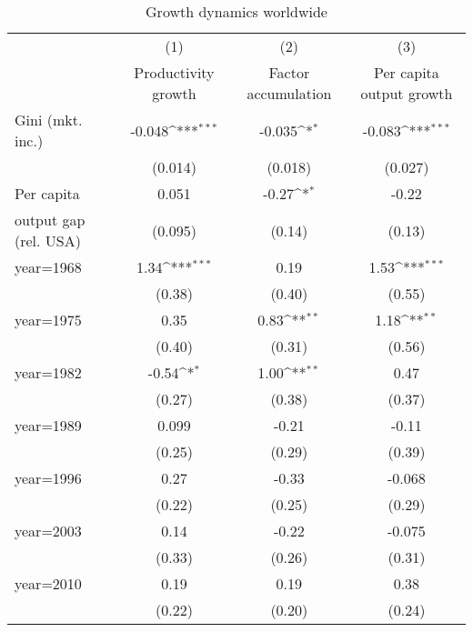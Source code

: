 \begin{sidewaystable}[htbp]\centering
\def\sym#1{\ifmmode^{#1}\else\(^{#1}\)\fi}
\caption{Growth dynamics worldwide}
\begin{tabular}{l*{3}{c}}
\hline\hline
                &\multicolumn{1}{c}{(1)}&\multicolumn{1}{c}{(2)}&\multicolumn{1}{c}{(3)}\\
                &\multicolumn{1}{c}{Productivity growth}&\multicolumn{1}{c}{Factor accumulation}&\multicolumn{1}{c}{Per capita output growth}\\
\hline
Gini (mkt. inc.)&   -0.048\sym{***}&   -0.035\sym{*}  &   -0.083\sym{***}\\
                &  (0.014)         &  (0.018)         &  (0.027)         \\
[1em]
Per capita      &    0.051         &    -0.27\sym{*}  &    -0.22         \\
output gap (rel. USA)&  (0.095)         &   (0.14)         &   (0.13)         \\
[1em]
year=1968       &     1.34\sym{***}&     0.19         &     1.53\sym{***}\\
                &   (0.38)         &   (0.40)         &   (0.55)         \\
[1em]
year=1975       &     0.35         &     0.83\sym{**} &     1.18\sym{**} \\
                &   (0.40)         &   (0.31)         &   (0.56)         \\
[1em]
year=1982       &    -0.54\sym{*}  &     1.00\sym{**} &     0.47         \\
                &   (0.27)         &   (0.38)         &   (0.37)         \\
[1em]
year=1989       &    0.099         &    -0.21         &    -0.11         \\
                &   (0.25)         &   (0.29)         &   (0.39)         \\
[1em]
year=1996       &     0.27         &    -0.33         &   -0.068         \\
                &   (0.22)         &   (0.25)         &   (0.29)         \\
[1em]
year=2003       &     0.14         &    -0.22         &   -0.075         \\
                &   (0.33)         &   (0.26)         &   (0.31)         \\
[1em]
year=2010       &     0.19         &     0.19         &     0.38         \\
                &   (0.22)         &   (0.20)         &   (0.24)         \\

\end{tabular}
\end{sidewaystable}
